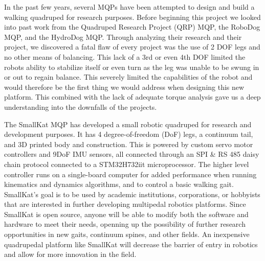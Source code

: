     In the past few years, several MQPs have been attempted to design and build a walking quadruped for research purposes. Before beginning this project we looked into past work from the Quadruped Research Project (QRP) MQP, the RoboDog MQP,\cite{RoboDog_MQP} and the HydroDog MQP. Through analyzing their research and their project, we discovered a fatal flaw of every project was the use of 2 DOF legs and no other means of balancing. This lack of a 3rd or even 4th DOF limited the robots ability to stabilize itself or even turn as the leg was unable to be swung in or out to regain balance. This severely limited the capabilities of the robot and would therefore be the first thing we would address when designing this new platform.  This combined with the lack of adequate torque analysis gave us a deep understanding into the downfalls of the projects. 

    The SmallKat MQP has developed a small robotic quadruped for research and development purposes. It has 4 degree-of-freedom (DoF) legs, a continuum tail, and 3D printed body and construction. This is powered by custom servo motor controllers and 9DoF IMU sensors, all connected through an SPI \& RS 485 daisy chain protocol connected to a STM32H732iit microprocessor. The higher level controller runs on a single-board computer for added performance when running kinematics and dynamics algorithms, and to control a basic walking gait. SmallKat's goal is to be used by academic institutions, corporations, or hobbyists that are interested in further developing multipedal robotics platforms. Since SmallKat is open source, anyone will be able to modify both the software and hardware to meet their needs, openning up the possibility of further research opportunities in new gaits, continuum spines, and other fields. An inexpensive quadrupedal platform like SmallKat will decrease the barrier of entry in robotics and allow for more innovation in the field.
